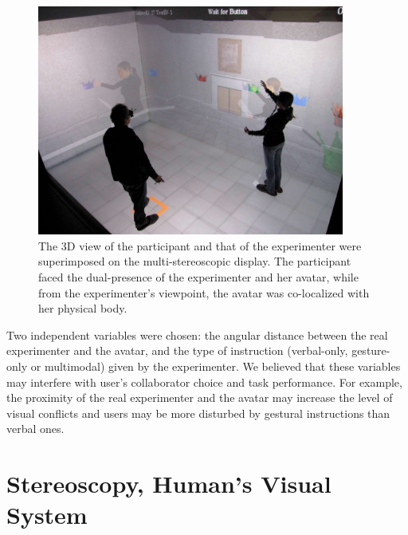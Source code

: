 \begin{figure}[tb]
  \centering
  \includegraphics[width=0.9\textwidth]{figures/2_demo}
  \caption{\label{fig:2_demo}The 3D view of the participant and that of the experimenter were superimposed on the multi-stereoscopic display. The participant faced the dual-presence of the experimenter and her avatar, while from the experimenter's viewpoint, the avatar was co-localized with her physical body.}
\end{figure}

Two independent variables were chosen: the angular distance between the real experimenter and the avatar, and the type of instruction (verbal-only, gesture-only or multimodal) given by the experimenter. We believed that these variables may interfere with user's collaborator choice and task performance. For example, the proximity of the real experimenter and the avatar may increase the level of visual conflicts and users may be more disturbed by gestural instructions than verbal ones.


\section{Stereoscopy, Human's Visual System}


